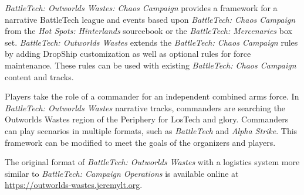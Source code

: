 \emph{BattleTech: Outworlds Wastes: Chaos Campaign} provides a framework for a narrative BattleTech league and events based upon \emph{BattleTech: Chaos Campaign} from the \emph{Hot Spots: Hinterlands} sourcebook or the \emph{BattleTech: Mercenaries} box set.
\emph{BattleTech: Outworlds Wastes} extends the \emph{BattleTech: Chaos Campaign} rules by adding DropShip customization as well as optional rules for force maintenance.
These rules can be used with existing \emph{BattleTech: Chaos Campaign} content and tracks.

Players take the role of a commander for an independent combined arms force.
In \emph{BattleTech: Outworlds Wastes} narrative tracks, commanders are searching the Outworlds Wastes region of the Periphery for LosTech and glory.
Commanders can play scenarios in multiple formats, such as \emph{BattleTech} and \emph{Alpha Strike}.
This framework can be modified to meet the goals of the organizers and players.

The original format of \emph{BattleTech: Outworlds Wastes} with a logistics system more similar to \emph{BattleTech: Campaign Operations} is available online at \href{https://outworlds-wastes.jeremylt.org}{https://outworlds-wastes.jeremylt.org}.

